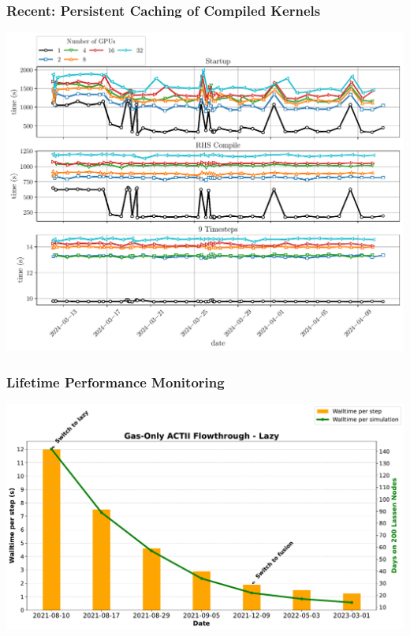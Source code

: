 \begin{frame}\frametitle{Recent: Persistent Caching of Compiled Kernels}
\begin{center}
  \includegraphics[width=.7\textwidth]{Figures/mtc/y3-recent-cached_1.pdf}
\end{center}
\end{frame}




\begin{frame}\frametitle{Lifetime Performance Monitoring}
\centering
\includegraphics[width=.8\textwidth]{Figures/mtc/gas-only-perf.pdf}
\end{frame}

